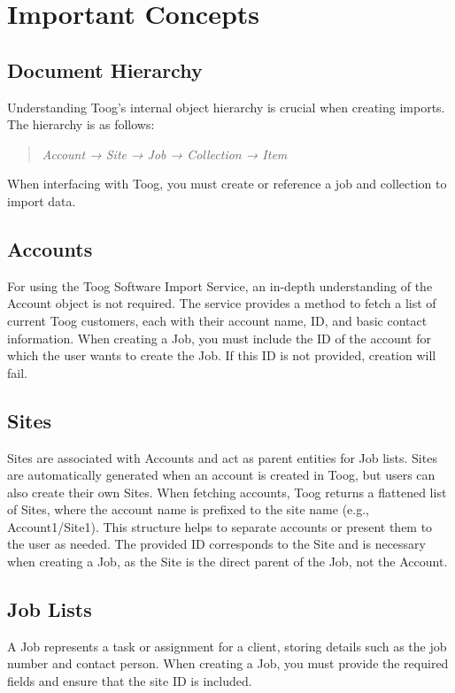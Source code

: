 \documentclass{memoir}
\begin{document}
	\section{Important Concepts}
	
	\subsection{Document Hierarchy}
	Understanding Toog's internal object hierarchy is crucial when creating imports. The hierarchy is as follows:
	\begin{quote}
		\textit{Account → Site → Job → Collection → Item}
	\end{quote}
	When interfacing with Toog, you must create or reference a job and collection to import data.
	
	\subsection{Accounts}
	For using the Toog Software Import Service, an in-depth understanding of the Account object is not required. The service provides a method to fetch a list of current Toog customers, each with their account name, ID, and basic contact information. When creating a Job, you must include the ID of the account for which the user wants to create the Job. If this ID is not provided, creation will fail.
	
	\subsection{Sites}
	Sites are associated with Accounts and act as parent entities for Job lists. Sites are automatically generated when an account is created in Toog, but users can also create their own Sites. When fetching accounts, Toog returns a flattened list of Sites, where the account name is prefixed to the site name (e.g., Account1/Site1). This structure helps to separate accounts or present them to the user as needed. The provided ID corresponds to the Site and is necessary when creating a Job, as the Site is the direct parent of the Job, not the Account.
	
	\subsection{Job Lists}
	A Job represents a task or assignment for a client, storing details such as the job number and contact person. When creating a Job, you must provide the required fields and ensure that the site ID is included.
	
\end{document}
